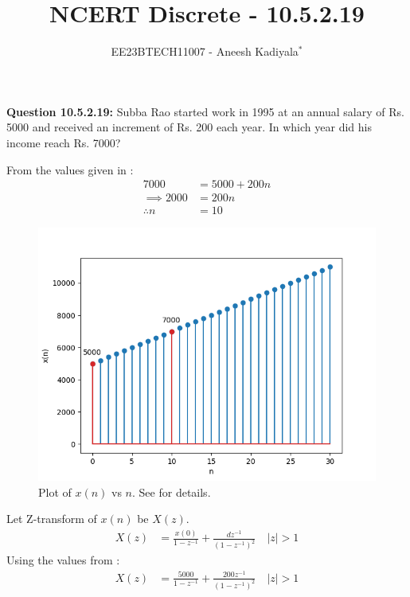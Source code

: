\documentclass[journal,12pt,twocolumn]{IEEEtran}
\theoremstyle{remark}
\begin{document}

\vspace{3cm}

\title{NCERT Discrete - 10.5.2.19}
\author{EE23BTECH11007 - Aneesh Kadiyala$^{*}$%
}
\maketitle
\newpage
\bigskip

\renewcommand{\thefigure}{\theenumi}
\renewcommand{\thetable}{\theenumi}
\vspace{3cm}
\textbf{Question 10.5.2.19:} Subba Rao started work in 1995 at an annual salary of Rs. 5000 and received an increment of Rs. 200 each year. In which year did his income reach Rs. 7000?

\solution
\fi

From the values given in :
\begin{align}
7000 &= 5000 + 200n \\
\implies 2000 &= 200n \\
\therefore n &= 10
\end{align}
\begin{figure}[h!]
    \centering
    \includegraphics[width=\columnwidth]{ncert-maths/10/5/2/19/figs/10_5_2_19.png}
    \caption{Plot of $x(n)$ vs $n$. See  for details.}
    \label{fig:math_10_5_2_19}
\end{figure}
Let Z-transform of $x(n)$ be $X(z)$.
\begin{align}
X(z) &= \frac{x(0)}{1 - z^{-1}} + \frac{dz^{-1}}{(1 - z^{-1})^2} \quad |z| > 1
\end{align}
Using the values from :
\begin{align}
X(z) &= \frac{5000}{1 - z^{-1}} + \frac{200z^{-1}}{(1 - z^{-1})^2} \quad |z| > 1
\end{align}
\end{document}
